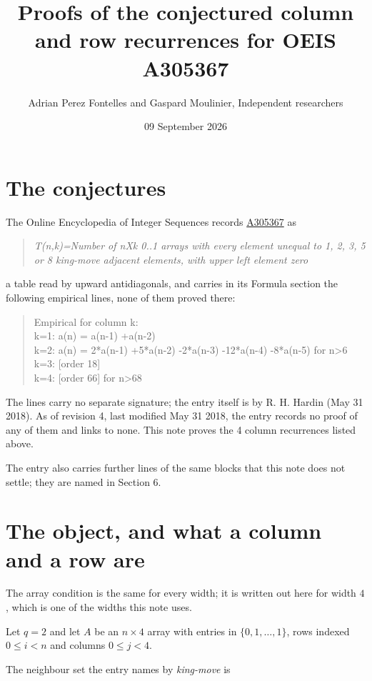 \documentclass[11pt]{article}
\title{Proofs of the conjectured column and row recurrences for OEIS A305367}
\author{Adrian Perez Fontelles and Gaspard Moulinier, Independent researchers}
\date{09 September 2026}
\theoremstyle{definition}
\begin{document}
\maketitle
\section{The conjectures}

The Online Encyclopedia of Integer Sequences records \href{https://oeis.org/A305367}{A305367} as

\begin{quote}\itshape T(n,k)=Number of nXk 0..1 arrays with every element unequal to 1, 2, 3, 5 or 8 king-move adjacent elements, with upper left element zero\end{quote}

a table read by upward antidiagonals, and carries in its Formula section the following empirical lines, none of them proved there:

\begin{quote}\ttfamily Empirical for column k:\\
k=1: a(n) = a(n-1) +a(n-2)\\k=2: a(n) = 2*a(n-1) +5*a(n-2) -2*a(n-3) -12*a(n-4) -8*a(n-5) for n>6\\k=3: [order 18]\\k=4: [order 66] for n>68\end{quote}

The lines carry no separate signature; the entry itself is by R. H. Hardin (May 31 2018). As of revision 4, last modified May 31 2018, the entry records no proof of any of them and links to none. This note proves the 4 column recurrences listed above.

The entry also carries further lines of the same blocks that this note does not settle; they are named in Section 6.

\section{The object, and what a column and a row are}

The array condition is the same for every width; it is written out here for width $4$, which is one of the widths this note uses.

Let $q = 2$ and let $A$ be an $n \times 4$ array with entries in $\{0,1,\dots,1\}$, rows indexed $0 \le i < n$ and columns $0 \le j < 4$.

The neighbour set the entry names by {\itshape king-move} is
\end{document}
